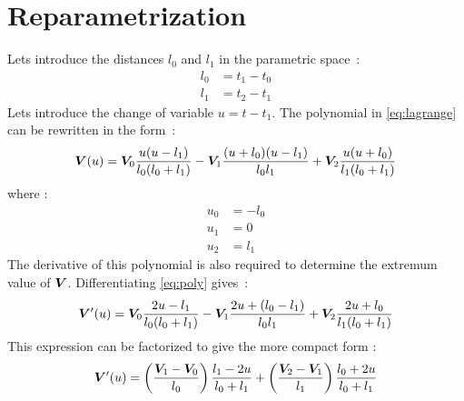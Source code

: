 \section{Reparametrization}
Lets introduce the distances $l_0$ and $l_1$ in the parametric space~:
\begin{subequations}
	\begin{alignat}{1}
	l_0 &= t_1 - t_0 \\
	l_1 &= t_2 - t_1
	\end{alignat}
\end{subequations}
Lets introduce the change of variable $u = t - t_1$. The polynomial in \cref{eq:lagrange} can be rewritten in the form~:
\begin{equation}
	\boldsymbol{V}(u) =
	\boldsymbol{V}_0 \frac{u(u-l_1)}{l_0(l_0+l_1)}
	- \boldsymbol{V}_1 \frac{(u+l_0)(u-l_1)}{l_0 l_1}
	+ \boldsymbol{V}_2 \frac{u(u+l_0)}{l_1(l_0+l_1)}
	\label{eq:poly}
\end{equation}
where :
\begin{subequations}
	\begin{alignat}{1}
	u_0 &= -l_0 \\
	u_1 &= 0 \\
	u_2 &= l_1
	\end{alignat}
\end{subequations}
The derivative of this polynomial is also required to determine the extremum value of $\boldsymbol{V}$. Differentiating \cref{eq:poly} gives~:
\begin{equation}
	\boldsymbol{V}'(u) =
	\boldsymbol{V}_0 \frac{2u - l_1}{l_0(l_0+l_1)}
	- \boldsymbol{V}_1 \frac{2u + (l_0 - l_1)}{l_0 l_1}
	+ \boldsymbol{V}_2 \frac{2u + l_0}{l_1(l_0+l_1)}
	\label{eq:dpoly}
\end{equation}
This expression can be factorized to give the more compact form :
\begin{equation}
	\boldsymbol{V}'(u) =
	\left(\frac{\boldsymbol{V}_1 - \boldsymbol{V}_0}{l_0}\right) \frac{l_1 - 2u}{l_0+l_1}
	+
	\left(\frac{\boldsymbol{V}_2 - \boldsymbol{V}_1}{l_1}\right)  \frac{l_0 + 2u}{l_0+l_1}
	\label{eq:dpoly2}
\end{equation}
